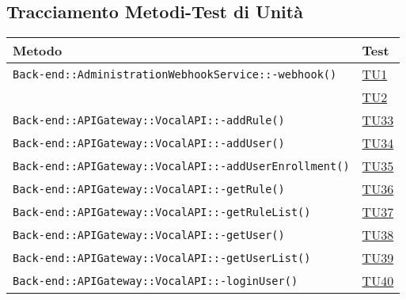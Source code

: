 \subsection{Tracciamento Metodi-Test di Unità}
\normalsize
\begin{longtable}{|>{\centering}m{12cm}|m{1cm}<{\centering}|}
\hline
\textbf{Metodo} & \textbf{Test}\\
\hline
\endhead\texttt{Back-end::AdministrationWebhookService::-\linebreak webhook()} & \hyperlink{TU1}{TU1}\\ & \hyperlink{TU2}{TU2}\\ \hline
\texttt{Back-end::APIGateway::VocalAPI::-\linebreak addRule()} & \hyperlink{TU33}{TU33}\\ \hline
\texttt{Back-end::APIGateway::VocalAPI::-\linebreak addUser()} & \hyperlink{TU34}{TU34}\\ \hline
\texttt{Back-end::APIGateway::VocalAPI::-\linebreak addUserEnrollment()} & \hyperlink{TU35}{TU35}\\ \hline
\texttt{Back-end::APIGateway::VocalAPI::-\linebreak getRule()} & \hyperlink{TU36}{TU36}\\ \hline
\texttt{Back-end::APIGateway::VocalAPI::-\linebreak getRuleList()} & \hyperlink{TU37}{TU37}\\ \hline
\texttt{Back-end::APIGateway::VocalAPI::-\linebreak getUser()} & \hyperlink{TU38}{TU38}\\ \hline
\texttt{Back-end::APIGateway::VocalAPI::-\linebreak getUserList()} & \hyperlink{TU39}{TU39}\\ \hline
\texttt{Back-end::APIGateway::VocalAPI::-\linebreak loginUser()} & \hyperlink{TU40}{TU40}\\ \hline

\end{longtable}
